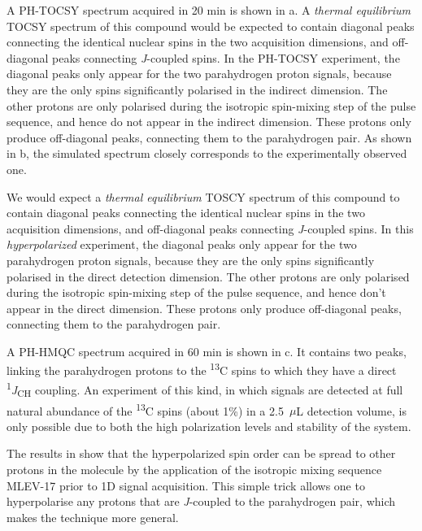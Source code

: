 A PH-TOCSY spectrum acquired in 20 min is shown in a.
A \emph{thermal equilibrium} TOCSY spectrum of this compound would be
expected to
contain diagonal peaks connecting the identical nuclear spins in the two
acquisition dimensions, and off-diagonal peaks connecting \emph{J}-coupled
spins. In the PH-TOCSY experiment, the diagonal peaks only appear
for the two parahydrogen proton signals, because they are the only spins
significantly polarised in the indirect dimension. The other protons
are only polarised during the isotropic spin-mixing step of the pulse sequence,
and hence do not appear in the indirect dimension. These protons only produce
off-diagonal peaks, connecting them to the parahydrogen pair.
As shown in b, the simulated spectrum
closely corresponds to the experimentally observed one.

We would expect a \emph{thermal equilibrium} TOSCY spectrum of this compound to
contain diagonal peaks connecting the identical nuclear spins in the two
acquisition dimensions, and off-diagonal peaks connecting \emph{J}-coupled
spins. In this \emph{hyperpolarized} experiment, the diagonal peaks only appear
for the two parahydrogen proton signals, because they are the only spins
significantly polarised in the direct detection dimension. The other protons
are only polarised during the isotropic spin-mixing step of the pulse sequence,
and hence don't appear in the direct dimension. These protons only produce
off-diagonal peaks, connecting them to the parahydrogen pair.

A PH-HMQC spectrum acquired in 60 min is shown in c.
It contains two peaks, linking the parahydrogen protons to the
\textsuperscript{13}C spins to which they have a direct
\textsuperscript{1}\emph{J}\textsubscript{CH} coupling.
An experiment of this kind, in which signals are
detected at full natural abundance of the \textsuperscript{13}C spins (about
1\%) in a 2.5~$\mu$L  detection volume, is only possible due to both the high
polarization levels and stability of the system.

The results in  show that the hyperpolarized spin order
can be spread to other
protons in the molecule by the application of the isotropic mixing
sequence MLEV-17
 \cite{levittSupercyclesBroadbandHeteronuclear1982,baxMLEV17basedTwodimensionalHomonuclear1985}
 prior to 1D signal acquisition.
\cbend
 This simple trick
allows one to hyperpolarise any protons that are \emph{J}-coupled to the
parahydrogen pair, which makes the technique more general.

